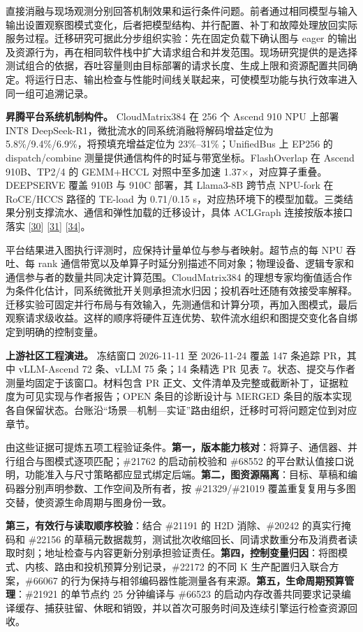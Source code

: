 \documentclass[UTF8,10.5pt,fontset=windows]{ctexart}
\begin{document}
直接消融与现场观测分别回答机制效果和运行条件问题。前者通过相同模型与输入输出设置观察图模式变化，后者把模型结构、并行配置、补丁和故障处理放回实际服务过程。迁移研究可据此分步组织实验：先在固定负载下确认图与
eager
的输出及资源行为，再在相同软件栈中扩大请求组合和并发范围。现场研究提供的是选择测试组合的依据，吞吐容量则由目标部署的请求长度、生成上限和资源配置共同确定。将运行日志、输出检查与性能时间线关联起来，可使模型功能与执行效率进入同一组可追溯记录。

\textbf{昇腾平台系统机制构件。} CloudMatrix384 在 256 个 Ascend 910 NPU
上部署 INT8 DeepSeek-R1，微批流水的同系统消融将解码增益定位为
5.8\%/9.4\%/6.9\%，将预填充增益定位为 23\%--31\%；UnifiedBus 上 EP256 的
dispatch/combine 测量提供通信构件的时延与带宽坐标。FlashOverlap 在
Ascend 910B、TP2/4 的 GEMM+HCCL 对照中至多加速
1.37\(\times\)，对应算子重叠。DEEPSERVE 覆盖 910B 与 910C 部署，其 Llama3-8B
跨节点 NPU-fork 在 RoCE/HCCS 路径的 TE-load 为 0.71/0.15
s，对应热环境下的模型加载。三类结果分别支撑流水、通信和弹性加载的迁移设计，具体
ACLGraph 连接按版本接口落实
{[}\protect\hyperlink{ref-zuo2025cloudmatrix384}{30}{]}
{[}\protect\hyperlink{ref-hong2026flashoverlap}{31}{]}
{[}\protect\hyperlink{ref-hu2025deepserve}{34}{]}。

平台结果进入图执行评测时，应保持计量单位与参与者映射。超节点的每 NPU
吞吐、每 rank
通信带宽以及单算子时延分别描述不同对象；物理设备、逻辑专家和通信参与者的数量共同决定计算范围。CloudMatrix384
的理想专家均衡值适合作为条件化估计，同系统微批开关则承担流水归因；投机吞吐还随有效接受率解释。迁移实验可固定并行布局与有效输入，先测通信和计算分项，再加入图模式，最后观察请求级收益。这样的顺序将硬件互连优势、软件流水组织和图提交变化各自绑定到明确的控制变量。

\textbf{上游社区工程演进。} 冻结窗口 2026-11-11 至 2026-11-24 覆盖 147
条追踪 PR，其中 vLLM-Ascend 72 条、vLLM 75 条；14 条精选 PR 见表
7。状态、提交与作者测量均固定于该窗口。材料包含 PR
正文、文件清单及完整或截断补丁，证据粒度为可见实现与作者报告；OPEN
条目的诊断设计与 MERGED
条目的版本实现各自保留状态。台账沿``场景---机制---实证''路由组织，迁移时可将问题定位到对应章节。

由这些证据可提炼五项工程验证条件。\textbf{第一，版本能力核对}：将算子、通信器、并行组合与图模式逐项匹配；\#21762
的启动前校验和 \#68552
的平台默认值接口说明，功能准入与尺寸策略都应显式绑定后端。\textbf{第二，图资源隔离}：目标、草稿和编码器分别声明参数、工作空间及所有者，按
\#21329/\#21019 覆盖重复复用与多图交替，使资源生命周期与图身份一致。

\textbf{第三，有效行与读取顺序校验}：结合 \#21191 的 H2D 消除、\#20242
的真实行掩码和 \#22156
的草稿元数据裁剪，测试批次收缩回长、同请求数重分布及消费者读取时刻；地址检查与内容更新分别承担验证责任。\textbf{第四，控制变量归因}：将图模式、内核、路由和投机预算分别记录，\#22172
的不同 K 生产配置归入联合方案，\#66067
的行为保持与相邻编码器性能测量各有来源。\textbf{第五，生命周期预算管理}：\#21921
的单节点约 25 分钟编译与 \#66523
的启动内存改善共同要求记录编译缓存、捕获驻留、休眠和销毁，并以首次可服务时间及连续引擎运行检查资源回收。
\end{document}
